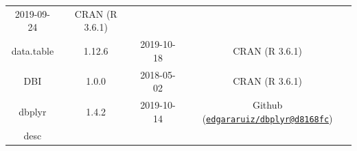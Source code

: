 \documentclass[11pt,]{book}
\begin{document}
\begin{longtable}[]{@{}cccc@{}}
\begin{minipage}[t]{0.16\columnwidth}
2019-09-24\strut
\end{minipage} & \begin{minipage}[t]{0.36\columnwidth}\centering\strut
CRAN (R 3.6.1)\strut
\end{minipage}\tabularnewline
\begin{minipage}[t]{0.18\columnwidth}\centering\strut
data.table\strut
\end{minipage} & \begin{minipage}[t]{0.19\columnwidth}\centering\strut
1.12.6\strut
\end{minipage} & \begin{minipage}[t]{0.16\columnwidth}\centering\strut
2019-10-18\strut
\end{minipage} & \begin{minipage}[t]{0.36\columnwidth}\centering\strut
CRAN (R 3.6.1)\strut
\end{minipage}\tabularnewline
\begin{minipage}[t]{0.18\columnwidth}\centering\strut
DBI\strut
\end{minipage} & \begin{minipage}[t]{0.19\columnwidth}\centering\strut
1.0.0\strut
\end{minipage} & \begin{minipage}[t]{0.16\columnwidth}\centering\strut
2018-05-02\strut
\end{minipage} & \begin{minipage}[t]{0.36\columnwidth}\centering\strut
CRAN (R 3.6.1)\strut
\end{minipage}\tabularnewline
\begin{minipage}[t]{0.18\columnwidth}\centering\strut
dbplyr\strut
\end{minipage} & \begin{minipage}[t]{0.19\columnwidth}\centering\strut
1.4.2\strut
\end{minipage} & \begin{minipage}[t]{0.16\columnwidth}\centering\strut
2019-10-14\strut
\end{minipage} & \begin{minipage}[t]{0.36\columnwidth}\centering\strut
Github
(\href{mailto:edgararuiz/dbplyr@d8168fc}{\nolinkurl{edgararuiz/dbplyr@d8168fc}})\strut
\end{minipage}\tabularnewline
\begin{minipage}[t]{0.18\columnwidth}\centering\strut
desc\strut
\end{minipage} & \begin{minipage}[t]{0.19\columnwidth}\centering\strut

\end{minipage}
\end{longtable}
\end{document}
